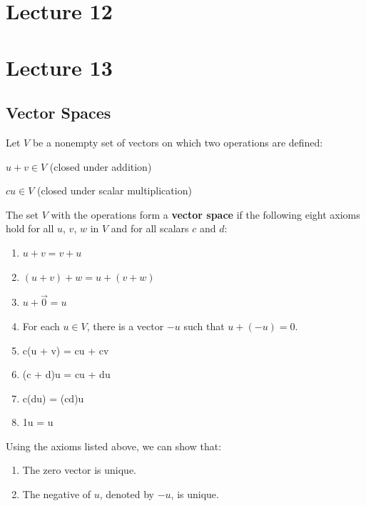 \documentclass[12pt, letterpaper]{article}
\begin{document}

\section*{Lecture 12}


\section*{Lecture 13}

\subsection*{Vector Spaces}

Let $ V $ be a nonempty set of vectors on which two operations are defined:

\medskip
{\centering

  $ u + v \in V $ (closed under addition)
  \medskip

  $ cu \in V $ (closed under scalar multiplication)

}
\medskip

The set $ V $ with the operations form a \textbf{vector space} if the
following eight axioms hold for all $ u $, $ v $, $ w $ in $ V $ and
for all scalars $ c $ and $ d $:

\begin{enumerate}
  \item $ u + v = v + u $
  \item $ (u + v) + w = u + (v + w) $
  \item $ u + \vec{0} = u $
  \item For each $ u \in V $, there is a vector $ -u $ such that $ u
    + (-u) = 0 $.
  \item c(u + v) = cu + cv
  \item (c + d)u = cu + du
  \item c(du) = (cd)u
  \item 1u = u
\end{enumerate}

Using the axioms listed above, we can show that:

\begin{enumerate}
  \item The zero vector is unique.
  \item The negative of $ u $, denoted by $ -u $, is unique.
\end{enumerate}
\end{document}
